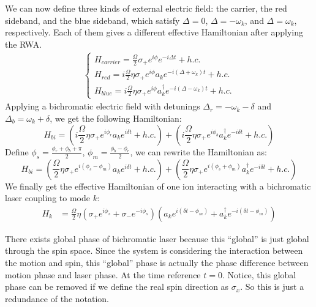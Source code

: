 \documentclass{simple-notes}
\begin{document}
We can now define three kinds of external electric field: the carrier, the red sideband, and the blue sideband, which satisfy $\Delta = 0$, $\Delta = - \omega_k$, and $\Delta = \omega_k$, respectively. Each of them gives a different effective Hamiltonian after applying the RWA.
\begin{align}
    \begin{cases*}
    H_{carrier} = \frac{\Omega}{2} \sigma_+ e^{i\phi}e^{-i\Delta t} + h.c. \\
    H_{red} = i \frac{\Omega}{2} \eta \sigma_+ e^{i\phi} a_k e^{-i(\Delta + \omega_k) t} + h.c. \\
    H_{blue} = i \frac{\Omega}{2} \eta \sigma_+ e^{i\phi} a_k^\dagger e^{-i(\Delta - \omega_k) t} + h.c.
    \end{cases*}
\end{align}
Applying a bichromatic electric field with detunings $\Delta_{r} = - \omega_k - \delta$ and $\Delta_{b} = \omega_k + \delta$, we get the following Hamiltonian:
\begin{equation}
    H_{bi} = (i \frac{\Omega}{2} \eta \sigma_+ e^{i\phi_r} a_k e^{i\delta t} + h.c.) + (i \frac{\Omega}{2} \eta \sigma_+ e^{i\phi_b} a_k^\dagger e^{-i\delta t} + h.c.)
\end{equation}
Define $\phi_s = \frac{\phi_r + \phi_b + \pi}{2}$, $\phi_m = \frac{\phi_b - \phi_r}{2}$, we can rewrite the Hamiltonian as:
\begin{equation}
    H_{bi} = ( \frac{\Omega}{2} \eta \sigma_+ e^{i(\phi_s - \phi_m)} a_k e^{i\delta t} + h.c.) + ( \frac{\Omega}{2} \eta \sigma_+ e^{i(\phi_s + \phi_m)} a_k^\dagger e^{-i\delta t} + h.c.)
\end{equation}
We finally get the effective Hamiltonian of one ion interacting with a bichromatic laser coupling to mode $k$:
\begin{align}
    H_k &= \frac{\Omega}{2} \eta (\sigma_+ e^{i\phi_s} + \sigma_- e^{-i\phi_s})(a_k e^{i(\delta t - \phi_m)} + a_k^\dagger e^{-i(\delta t - \phi_m)})
\end{align}
\begin{notebox}
There exists global phase of bichromatic laser because this ``global'' is just global through the spin space. Since the system is considering the interaction between the motion and spin, this ``global'' phase is actually the phase difference between motion phase and laser phase. At the time reference $t=0$. Notice, this global phase can be removed if we define the real spin direction as $\sigma_x$. So this is just a redundance of the notation.  
\end{notebox}
\end{document}
